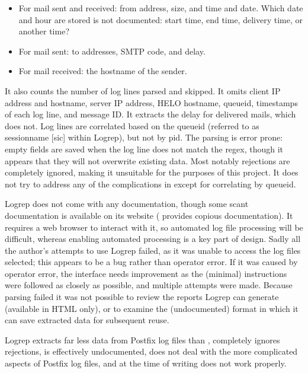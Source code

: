 \begin{itemize}

    \item For mail sent and received: from address, size, and time and
        date.  Which date and hour are stored is not documented: start
        time, end time, delivery time, or another time?

    \item For mail sent: to addresses, \gls{SMTP} code, and delay.

    \item For mail received: the hostname of the sender.

\end{itemize}

It also counts the number of log lines parsed and skipped.  It omits client
\gls{IP} address and hostname, server \gls{IP} address, HELO hostname,
queueid, timestamps of each log line, and message ID\@.  It extracts the
delay for delivered mails, which \parsername{} does not.  Log lines are
correlated based on the queueid (referred to as sessionname [sic] within
Logrep), but not by \gls{pid}.  The parsing is error prone: empty fields
are saved when the log line does not match the regex, though it appears
that they will not overwrite existing data.  Most notably rejections are
completely ignored, making it unsuitable for the purposes of this project.
It does not try to address any of the complications in
 except for correlating by queueid.

Logrep does not come with any documentation, though some scant
documentation is available on its website (\parsername{} provides copious
documentation).  It requires a web browser to interact with it, so
automated log file processing will be difficult, whereas enabling automated
processing is a key part of \parsernames{} design.  Sadly all the author's
attempts to use Logrep failed, as it was unable to access the log files
selected; this appears to be a bug rather than operator error.  If it was
caused by operator error, the interface needs improvement as the (minimal)
instructions were followed as closely as possible, and multiple attempts
were made.  Because parsing failed it was not possible to review the
reports Logrep can generate (available in HTML only), or to examine the
(undocumented) format in which it can save extracted data for subsequent
reuse.

Logrep extracts far less data from Postfix log files than \parsername{},
completely ignores rejections, is effectively undocumented, does not deal
with the more complicated aspects of Postfix log files, and at the time of
writing does not work properly.

